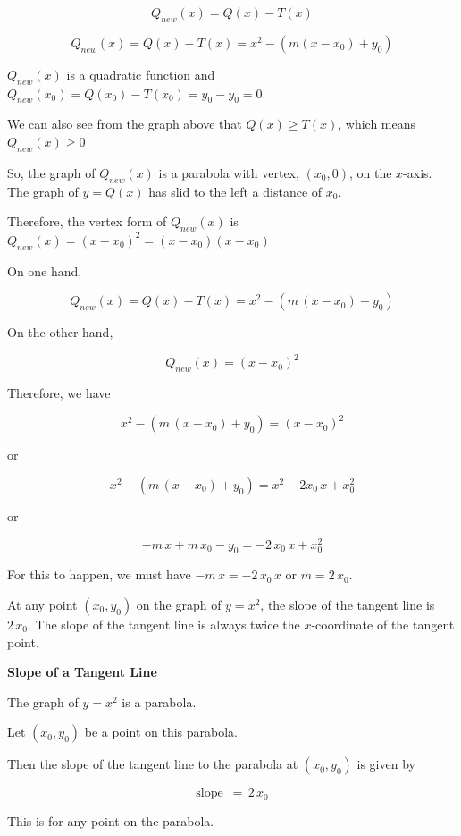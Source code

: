 \documentclass{ximera}
\begin{document}
\begin{explanation}


\[
Q_{new}(x) = Q(x) - T(x) 
\]

\[
Q_{new}(x) = Q(x) - T(x) = x^2 - (m(x - x_0) + y_0)
\]




$Q_{new}(x)$ is a quadratic function and $Q_{new}(x_0) = Q(x_0) - T(x_0) = y_0 - y_0 = 0$. 


We can also see from the graph above that $Q(x) \geq T(x)$, which means $Q_{new}(x) \geq 0$


So, the graph of $Q_{new}(x)$ is a parabola with vertex, $(x_0, 0)$, on the $x$-axis.  The graph of $y = Q(x)$ has slid to the left a distance of $x_0$.  


Therefore, the vertex form of $Q_{new}(x)$ is $Q_{new}(x) = (x - x_0)^2 = (x - x_0)(x - x_0)$  




On one hand,

\[
Q_{new}(x) = Q(x) - T(x) = x^2 - (m \, (x - x_0) + y_0) 
\]



On the other hand,


\[
Q_{new}(x) = (x - x_0)^2
\]



Therefore, we have

\[
x^2 - (m \, (x - x_0) + y_0) =  (x - x_0)^2
\]


or


\[
x^2 - (m \, (x - x_0) + y_0) =  x^2 - 2 x_0 \, x + x_0^2
\]


or


\[
 -m \, x + m \, x_0 - y_0 =   - 2 \, x_0 \, x + x_0^2
\]


For this to happen, we must have $-m \, x = - 2 \, x_0 \, x$ or \textbf{$m = 2 \, x_0$}. 


\end{explanation}


At any point $(x_0, y_0)$ on the graph of $y = x^2$, the slope of the tangent line is $2 \, x_0$.  The slope of the tangent line is always twice the $x$-coordinate of the tangent point.














\begin{conclusion} \textbf{\textcolor{green!25!black}{Slope of a Tangent Line}} 


The graph of $y = x^2$ is a parabola.

Let $(x_0, y_0)$ be a point on this parabola.

Then the slope of the tangent line to the parabola at $(x_0, y_0)$ is given by 



\[ \text{slope } \, = \, 2 \, x_0  \]


\end{conclusion}
This is for any point on the parabola. 
\end{document}
